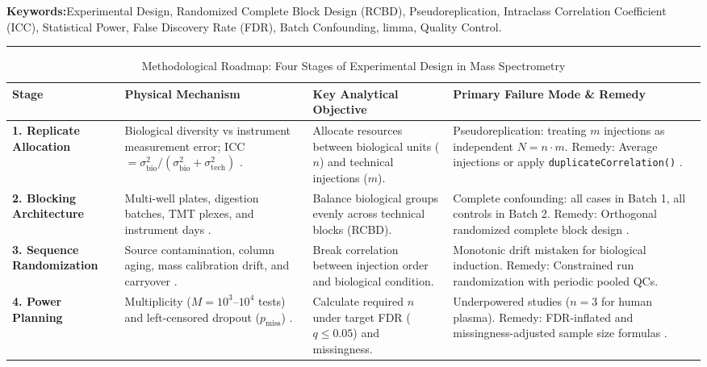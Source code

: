 \documentclass[11pt,twoside,openright]{book}
\begin{document}
\noindent
\textbf{Keywords:}\enspace Experimental Design, Randomized Complete Block Design (RCBD), Pseudoreplication, Intraclass Correlation Coefficient (ICC), Statistical Power, False Discovery Rate (FDR), Batch Confounding, limma, Quality Control.

\vspace{0.8em}
\noindent\rule{\textwidth}{0.4pt}


\begin{table}[ht]
\centering
\caption{Methodological Roadmap: Four Stages of Experimental Design in Mass Spectrometry}
\label{tab:design_roadmap}
\small
\begin{tabularx}{\textwidth}{l p{3.8cm} p{4.2cm} X}
\toprule
\textbf{Stage} & \textbf{Physical Mechanism} & \textbf{Key Analytical Objective} & \textbf{Primary Failure Mode \& Remedy} \\
\midrule
\textbf{1. Replicate Allocation} & Biological diversity vs instrument measurement error; ICC $= \sigma^2_{\text{bio}} / (\sigma^2_{\text{bio}} + \sigma^2_{\text{tech}})$ \cite{shrout1979intraclass, hurlbert1984pseudoreplication}. & Allocate resources between biological units ($n$) and technical injections ($m$). & Pseudoreplication: treating $m$ injections as independent $N = n \cdot m$. Remedy: Average injections or apply \texttt{duplicateCorrelation()} \cite{smyth2004linear}. \\
\addlinespace
\textbf{2. Blocking Architecture} & Multi-well plates, digestion batches, TMT plexes, and instrument days \cite{fisher1935design, box1978statistics}. & Balance biological groups evenly across technical blocks (RCBD). & Complete confounding: all cases in Batch 1, all controls in Batch 2. Remedy: Orthogonal randomized complete block design \cite{leek2010tackling, johnson2007adjusting}. \\
\addlinespace
\textbf{3. Sequence Randomization} & Source contamination, column aging, mass calibration drift, and carryover \cite{broadhurst2018guidelines, graw2020statistical}. & Break correlation between injection order and biological condition. & Monotonic drift mistaken for biological induction. Remedy: Constrained run randomization with periodic pooled QCs. \\
\addlinespace
\textbf{4. Power Planning} & Multiplicity ($M = 10^3$--$10^4$ tests) and left-censored dropout ($p_{\text{miss}}$) \cite{karpievitch2012normalization, hoenig2001abuse}. & Calculate required $n$ under target FDR ($q \le 0.05$) and missingness. & Underpowered studies ($n=3$ for human plasma). Remedy: FDR-inflated and missingness-adjusted sample size formulas \cite{benjamini1995controlling, cohen1988statistical}. \\
\bottomrule
\end{tabularx}
\end{table}
\end{document}
